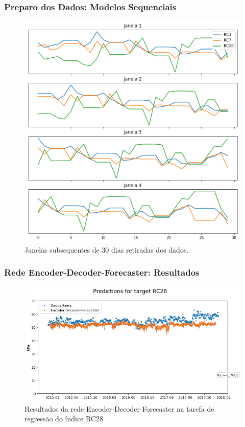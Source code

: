 \documentclass{beamer}
\begin{document}
\begin{frame}
  \frametitle{Preparo dos Dados: Modelos Sequenciais}
    \begin{figure}[H]
  \centering
  \includegraphics[scale=0.3]{slides_windows}
  \caption{Janelas subsequentes de 30 dias retiradas dos dados.}
\end{figure}
\end{frame}


\begin{frame}
\frametitle{Rede Encoder-Decoder-Forecaster: Resultados}  
\begin{figure}[H]
\centering
\includegraphics[width=0.9\columnwidth]{exped_saco_2008-2015-2017encdecRC28.png}
\caption{Resultados da rede Encoder-Decoder-Forecaster na tarefa de regressão do índice RC28}
\label{fig:3nseq}
\end{figure}
\end{frame}
\end{document}
